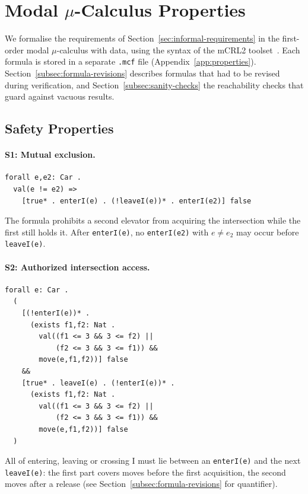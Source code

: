 \section{Modal \texorpdfstring{$\mu$}{mu}-Calculus Properties}
\label{sec:mu-calculus}

We formalise the requirements of Section~\ref{sec:informal-requirements} in the first-order modal \(\mu\)-calculus with data, using the syntax of the mCRL2 toolset~\cite{groote2014modeling}. Each formula is stored in a separate \texttt{.mcf} file (Appendix~\ref{app:properties}). Section~\ref{subsec:formula-revisions} describes formulas that had to be revised during verification, and Section~\ref{subsec:sanity-checks} the reachability checks that guard against vacuous results.

\subsection{Safety Properties}
\label{subsec:safety-properties}

\paragraph{S1: Mutual exclusion.}
\noindent \begin{lstlisting}
forall e,e2: Car .
  val(e != e2) =>
    [true* . enterI(e) . (!leaveI(e))* . enterI(e2)] false
\end{lstlisting}
The formula prohibits a second elevator from acquiring the intersection while the first still holds it. After \texttt{enterI(e)}, no \texttt{enterI(e2)} with \(e\neq e_2\) may occur before \texttt{leaveI(e)}.

\newpage

\paragraph{S2: Authorized intersection access.}
\noindent \begin{lstlisting}
forall e: Car .
  (
    [(!enterI(e))* .
      (exists f1,f2: Nat .
        val((f1 <= 3 && 3 <= f2) ||
            (f2 <= 3 && 3 <= f1)) &&
        move(e,f1,f2))] false
    &&
    [true* . leaveI(e) . (!enterI(e))* .
      (exists f1,f2: Nat .
        val((f1 <= 3 && 3 <= f2) ||
            (f2 <= 3 && 3 <= f1)) &&
        move(e,f1,f2))] false
  )
\end{lstlisting}
All of entering, leaving or crossing I must lie between an \texttt{enterI(e)} and the next \texttt{leaveI(e)}: the first part covers moves before the first acquisition, the second moves after a release (see Section~\ref{subsec:formula-revisions} for quantifier).

